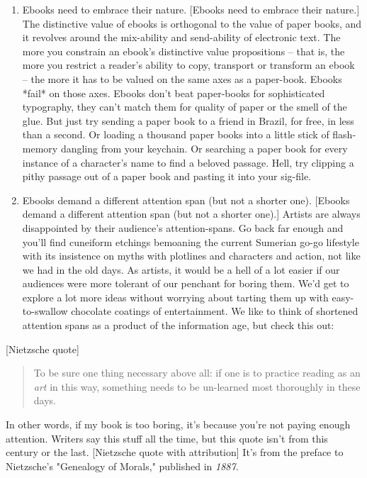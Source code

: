 \begin{enumerate}
\item
  Ebooks need to embrace their nature. [Ebooks need to embrace their
  nature.] The distinctive value of ebooks is orthogonal to the value
  of paper books, and it revolves around the mix-ability and
  send-ability of electronic text. The more you constrain an ebook's
  distinctive value propositions -- that is, the more you restrict a
  reader's ability to copy, transport or transform an ebook -- the
  more it has to be valued on the same axes as a paper-book. Ebooks
  *fail* on those axes. Ebooks don't beat paper-books for
  sophisticated typography, they can't match them for quality of
  paper or the smell of the glue. But just try sending a paper book
  to a friend in Brazil, for free, in less than a second. Or loading
  a thousand paper books into a little stick of flash-memory dangling
  from your keychain. Or searching a paper book for every instance of
  a character's name to find a beloved passage. Hell, try clipping a
  pithy passage out of a paper book and pasting it into your
  sig-file.
\item
  Ebooks demand a different attention span (but not a shorter one).
  [Ebooks demand a different attention span (but not a shorter one).]
  Artists are always disappointed by their audience's
  attention-spans. Go back far enough and you'll find cuneiform
  etchings bemoaning the current Sumerian go-go lifestyle with its
  insistence on myths with plotlines and characters and action, not
  like we had in the old days. As artists, it would be a hell of a
  lot easier if our audiences were more tolerant of our penchant for
  boring them. We'd get to explore a lot more ideas without worrying
  about tarting them up with easy-to-swallow chocolate coatings of
  entertainment. We like to think of shortened attention spans as a
  product of the information age, but check this out:
\end{enumerate}
[Nietzsche quote]

\begin{quote}
To be sure one thing necessary above all: if one is to practice
reading as an \emph{art} in this way, something needs to be
un-learned most thoroughly in these days.

\end{quote}
In other words, if my book is too boring, it's because you're not
paying enough attention. Writers say this stuff all the time, but
this quote isn't from this century or the last. [Nietzsche quote
with attribution] It's from the preface to Nietzsche's "Genealogy
of Morals," published in \emph{1887.}

